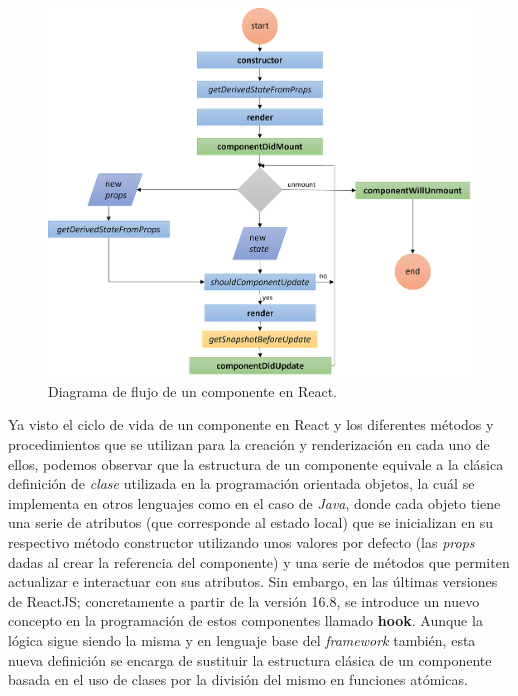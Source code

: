 \documentclass[../main.tex]{subfiles}
\begin{document}
    \begin{figure}[!h]
        \centering
        \includegraphics[width=\textwidth]{images/react_component_lifecycle_flu.png}
        \caption{Diagrama de flujo de un componente en React.}
        \label{fig::react_component_lifecycles_flu}
    \end{figure}
    
    Ya visto el ciclo de vida de un componente en React y los diferentes métodos y procedimientos que se utilizan para la creación y renderización en cada uno de ellos, podemos observar que la estructura de un componente equivale a la clásica definición de \textit{clase} utilizada en la programación orientada objetos, la cuál se implementa en otros lenguajes como en el caso de \textit{Java}, donde cada objeto tiene una serie de atributos (que corresponde al estado local) que se inicializan en su respectivo método constructor utilizando unos valores por defecto (las \textit{props} dadas al crear la referencia del componente) y una serie de métodos que permiten actualizar e interactuar con sus atributos. Sin embargo, en las últimas versiones de ReactJS; concretamente a partir de la versión 16.8, se introduce un nuevo concepto en la programación de estos componentes llamado \textbf{hook}. Aunque la lógica sigue siendo la misma y en lenguaje base del \textit{framework} también, esta nueva definición se encarga de sustituir la estructura clásica de un componente basada en el uso de clases por la división del mismo en funciones atómicas.\\ 
    
\end{document}
